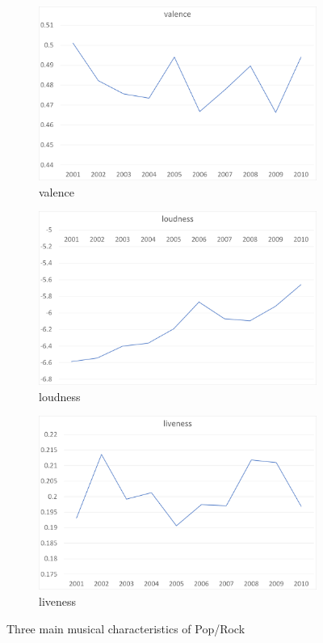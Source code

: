 \documentclass[12pt]{article}  %
\begin{document}
\begin{figure}[htbp]
\centering
\begin{subfigure}[b]{.7\textwidth}
\includegraphics[width=\textwidth]{img/valence.jpg}
\caption{valence}\label{subfig:valence}
\end{subfigure}
\begin{subfigure}[b]{.7\textwidth}
\includegraphics[width=\textwidth]{img/loudness.jpg}
\caption{loudness}\label{subfig:loudness}
\end{subfigure}
\begin{subfigure}[b]{.7\textwidth}
\includegraphics[width=\textwidth]{img/liveness.jpg}
\caption{liveness}\label{subfig:liveness}
\end{subfigure}
\caption{Three main musical characteristics of Pop/Rock}\label{fig:Three characteristics of Pop/Rock}
\end{figure}
\end{document}
